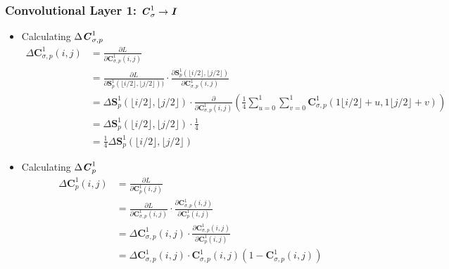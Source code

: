 \documentclass[12pt]{article}
\begin{document}
\subsubsection{Convolutional Layer 1: $\textbf{\textit{C}}^1_\sigma \rightarrow \textbf{\textit{I}}$}
\begin{itemize}
\item Calculating $\Delta \textbf{\textit{C}}_{\sigma, p}^1$
\begin{align*}
    \Delta \bm{C}_{\sigma, p}^1(i, j)
    &= \frac{\partial L}{\partial \bm{C}_{\sigma, p}^1(i, j)}\\
    &= \frac{\partial L}{\partial \bm{S}_{p}^1(\lfloor{i / 2}\rfloor, \lfloor{j / 2}\rfloor))}
    \cdot
    \frac{\partial \bm{S}_{p}^1(\lfloor{i / 2}\rfloor, \lfloor{j / 2}\rfloor)}{\partial \bm{C}_{\sigma, p}^1(i, j)}\\
    &= \Delta \bm{S}_{p}^1(\lfloor{i / 2}\rfloor, \lfloor{j / 2}\rfloor) \cdot \frac{\partial}{\partial \bm{C}_{\sigma, p}^1(i, j)}\left(\frac{1}{4}\sum_{u = 0}^1\sum_{v = 0}^1\bm{C}^1_{\sigma, p}\left(1\lfloor{i / 2}\rfloor + u, 1\lfloor{j / 2}\rfloor + v\right)\right)\\
    &= \Delta \bm{S}_{p}^1(\lfloor{i / 2}\rfloor, \lfloor{j / 2}\rfloor) \cdot \frac{1}{4}\\
    &= \frac{1}{4}\Delta \bm{S}_{p}^1(\lfloor{i / 2}\rfloor, \lfloor{j / 2}\rfloor)
\end{align*}

\item Calculating $\Delta \textbf{\textit{C}}_{p}^1$
\begin{align*}
    \Delta \bm{C}_{p}^1(i, j)
    &= \frac{\partial L}{\partial \bm{C}_{p}^1(i, j)}\\
    &= \frac{\partial L}{\partial \bm{C}_{\sigma, p}^1(i, j)}
    \cdot
    \frac{\partial \bm{C}_{\sigma, p}^1(i, j)}{\partial \bm{C}_{p}^1(i, j)}\\
    &= \Delta \bm{C}_{\sigma, p}^1(i, j)
    \cdot
    \frac{\partial \bm{C}_{\sigma, p}^1(i, j)}{\partial \bm{C}_{p}^1(i, j)}\\
    &= \Delta \bm{C}_{\sigma, p}^1(i, j)
    \cdot
    \bm{C}_{\sigma, p}^1(i, j)\left(1 - \bm{C}_{\sigma, p}^1(i, j)\right)
\end{align*}


\end{itemize}
\end{document}
